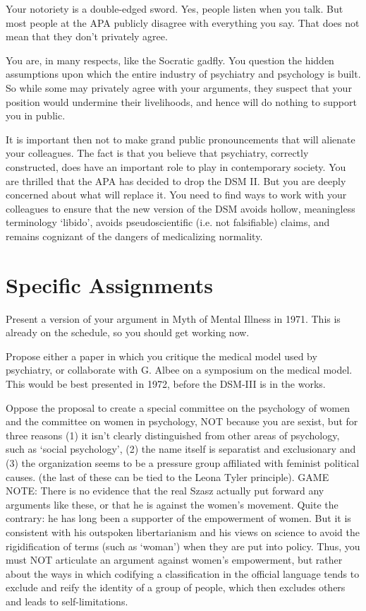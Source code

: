 \begin{refsection}
Your notoriety is a double-edged sword. Yes, people listen when you talk. But most people at the APA publicly disagree with everything you say. That does not mean that they don't privately agree.

You are, in many respects, like the Socratic gadfly. You question the hidden assumptions upon which the entire industry of psychiatry and psychology is built. So while some may privately agree with your arguments, they suspect that your position would undermine their livelihoods, and hence will do nothing to support you in public.

It is important then not to make grand public pronouncements that will alienate your colleagues. The fact is that you believe that psychiatry, correctly constructed, does have an important role to play in contemporary society. You are thrilled that the APA has decided to drop the DSM II. But you are deeply concerned about what will replace it. You need to find ways to work with your colleagues to ensure that the new version of the DSM avoids hollow, meaningless terminology `libido', avoids pseudoscientific (i.e. not falsifiable) claims, and remains cognizant of the dangers of medicalizing normality.

\section{Specific Assignments}
\label{specificassignments}

Present a version of your argument in Myth of Mental Illness in 1971. This is already on the schedule, so you should get working now.

Propose either a paper in which you critique the medical model used by psychiatry, or collaborate with G. Albee on a symposium on the medical model. This would be best presented in 1972, before the DSM-III is in the works.

Oppose the proposal to create a special committee on the psychology of women and the committee on women in psychology, NOT because you are sexist, but for three reasons (1) it isn't clearly distinguished from other areas of psychology, such as `social psychology', (2) the name itself is separatist and exclusionary and (3) the organization seems to be a pressure group affiliated with feminist political causes. (the last of these can be tied to the Leona Tyler principle). GAME NOTE: There is no evidence that the real Szasz actually put forward any arguments like these, or that he is against the women's movement. Quite the contrary: he has long been a supporter of the empowerment of women. But it is consistent with his outspoken libertarianism and his views on science to avoid the rigidification of terms (such as `woman') when they are put into policy. Thus, you must NOT articulate an argument against women's empowerment, but rather about the ways in which codifying a classification in the official language tends to exclude and reify the identity of a group of people, which then excludes others and leads to self-limitations.


\end{refsection}
